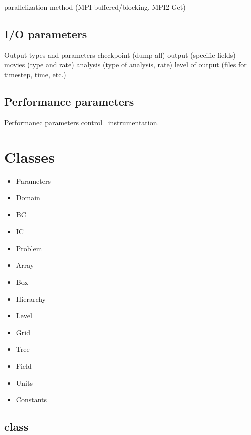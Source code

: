 \documentclass{article}
\begin{document}
   parallelization method (MPI buffered/blocking, MPI2 Get)


\subsection{I/O parameters} 

Output types and parameters
 checkpoint (dump all)
 output (specific fields)
 movies (type and rate)
 analysis (type of analysis, rate)
 level of output (files for timestep, time, etc.)


\subsection{Performance parameters} 

Performanec parameters control \lcaperf\ instrumentation.



\section{Classes} \label{s:classes}

\begin{itemize}
\item Parameters
\item Domain
\item BC
\item IC
\item Problem
\item Array
\item Box
\item Hierarchy
\item Level
\item Grid
\item Tree
\item Field
\item Units
\item Constants
\end{itemize}

\subsection{ class}
\end{document}
